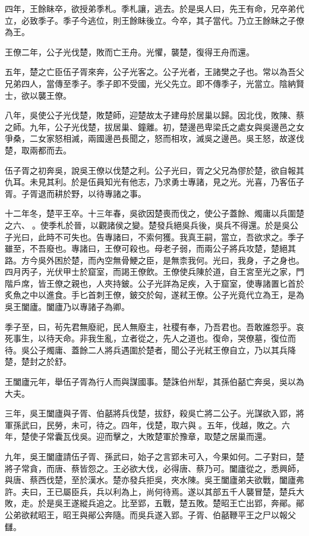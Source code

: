 四年，王餘眛卒，欲授弟季札。季札讓，逃去。於是吳人曰，先王有命，兄卒弟代立，必致季子。季子今逃位，則王餘眛後立。今卒，其子當代。乃立王餘眛之子僚為王。

王僚二年，公子光伐楚，敗而亡王舟。光懼，襲楚，復得王舟而還。

五年，楚之亡臣伍子胥來奔，公子光客之。公子光者，王諸樊之子也。常以為吾父兄弟四人，當傳至季子。季子即不受國，光父先立。即不傳季子，光當立。陰納賢士，欲以襲王僚。

八年，吳使公子光伐楚，敗楚師，迎楚故太子建母於居巢以歸。因北伐，敗陳、蔡之師。九年，公子光伐楚，拔居巢、鐘離。初，楚邊邑卑梁氏之處女與吳邊邑之女爭桑，二女家怒相滅，兩國邊邑長聞之，怒而相攻，滅吳之邊邑。吳王怒，故遂伐楚，取兩都而去。

伍子胥之初奔吳，說吳王僚以伐楚之利。公子光曰，胥之父兄為僇於楚，欲自報其仇耳。未見其利。於是伍員知光有他志，乃求勇士專諸，見之光。光喜，乃客伍子胥。子胥退而耕於野，以待專諸之事。

十二年冬，楚平王卒。十三年春，吳欲因楚喪而伐之，使公子蓋餘、燭庸以兵圍楚之六、𤅬。使季札於晉，以觀諸侯之變。楚發兵絕吳兵後，吳兵不得還。於是吳公子光曰，此時不可失也。告專諸曰，不索何獲。我真王嗣，當立，吾欲求之。季子雖至，不吾廢也。專諸曰，王僚可殺也。母老子弱，而兩公子將兵攻楚，楚絕其路。方今吳外困於楚，而內空無骨鯁之臣，是無柰我何。光曰，我身，子之身也。四月丙子，光伏甲士於窟室，而謁王僚飲。王僚使兵陳於道，自王宮至光之家，門階戶席，皆王僚之親也，人夾持鈹。公子光詳為足疾，入于窟室，使專諸置匕首於炙魚之中以進食。手匕首刺王僚，鈹交於匈，遂弒王僚。公子光竟代立為王，是為吳王闔廬。闔廬乃以專諸子為卿。

季子至，曰，茍先君無廢祀，民人無廢主，社稷有奉，乃吾君也。吾敢誰怨乎。哀死事生，以待天命。非我生亂，立者從之，先人之道也。復命，哭僚墓，復位而待。吳公子燭庸、蓋餘二人將兵遇圍於楚者，聞公子光弒王僚自立，乃以其兵降楚，楚封之於舒。

王闔廬元年，舉伍子胥為行人而與謀國事。楚誅伯州犁，其孫伯嚭亡奔吳，吳以為大夫。

三年，吳王闔廬與子胥、伯嚭將兵伐楚，拔舒，殺吳亡將二公子。光謀欲入郢，將軍孫武曰，民勞，未可，待之。四年，伐楚，取六與𤅬。五年，伐越，敗之。六年，楚使子常囊瓦伐吳。迎而擊之，大敗楚軍於豫章，取楚之居巢而還。

九年，吳王闔廬請伍子胥、孫武曰，始子之言郢未可入，今果如何。二子對曰，楚將子常貪，而唐、蔡皆怨之。王必欲大伐，必得唐、蔡乃可。闔廬從之，悉興師，與唐、蔡西伐楚，至於漢水。楚亦發兵拒吳，夾水陳。吳王闔廬弟夫欲戰，闔廬弗許。夫曰，王已屬臣兵，兵以利為上，尚何待焉。遂以其部五千人襲冒楚，楚兵大敗，走。於是吳王遂縱兵追之。比至郢，五戰，楚五敗。楚昭王亡出郢，奔鄖。鄖公弟欲弒昭王，昭王與鄖公奔隨。而吳兵遂入郢。子胥、伯嚭鞭平王之尸以報父讎。

